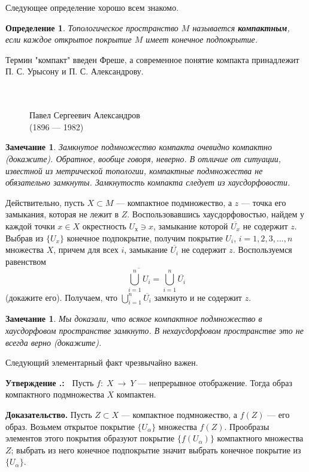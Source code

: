 \documentclass[12pt]{book}
\newcommand{\arrow}{{\:\longrightarrow\:}}
\def\endproof{\hbox{\vrule width 5pt height 5pt depth 0pt}}
\theoremstyle{upshape}
\newtheorem{zadacha}{Задача}[chapter]
\theoremstyle{generic}
\newtheorem{opredelenie}[teorema]{Определение}
\newtheorem{remark}[teorema]{Замечание}
\def\замечание{\begin{remark}}
\def\еза{\end{remark}}
\theoremstyle{upshapenonumber}
\newtheorem{ukazanie}{Указание}[section]
\newcommand{\следствие}{%
     \refstepcounter{teorema}
     {\noindent\bf Следствие \thechapter.\arabic{teorema}:\ }}
\newcommand{\пример}{%
     \refstepcounter{teorema}
     {\noindent\bf Пример \thechapter.\arabic{teorema}:\ }}
\newcommand{\лемма}{%
     \refstepcounter{teorema}
     {\noindent\bf Лемма \thechapter.\arabic{teorema}:\ }}
\newcommand{\теорема}{%
     \refstepcounter{teorema}
     {\noindent\bf Теорема \thechapter.\arabic{teorema}:\ }}
\newcommand{\утверждение}{%
     \refstepcounter{teorema}
     {\noindent\bf Утверждение \thechapter.\arabic{teorema}:\ }}
\def\хфилл{\hfill}
\def\ноиндент{\noindent}
\def\бф{\bf}
\def\ем{\em}
\def\задача{\begin{zadacha}}
\def\ез{\end{zadacha}}
\def\указание{\begin{ukazanie}}
\def\еу{\end{ukazanie}}
\def\определение{\begin{opredelenie}}
\def\ео{\end{opredelenie}}
\def\енум{\begin{enumerate}}
\def\ее{\end{enumerate}}
\begin{document}
Следующее определение хорошо всем знакомо.

\определение
Топологическое пространство $M$ называется
{\бф компактным}, если каждое открытое покрытие $M$
имеет конечное подпокрытие.
\ео

Термин "компакт" введен Фреше, а современное понятие
компакта принадлежит П. С. Урысону и П. С. Александрову.

\begin{figure}[ht]
\begin{center}\ \\
\\
{Павел Сергеевич Александров\\
(1896 --- 1982)}
\end{center}
\end{figure}

\замечание
Замкнутое подмножество компакта очевидно компак\-тно
(докажите). Обратное, вообще говоря, неверно.
В отличие от ситуации, известной из метрической
топологии, компактные подмножества не обязательно
замкнуты. Замкнутость компакта следует из хаусдорфовости.
\еза

Действительно, пусть $X \subset M$ --- компактное
подмножество, а $z$ --- точка его замыкания, которая
не лежит в $Z$. Воспользовавшись хаусдорфовостью, 
найдем у каждой точки $x\in X$ 
окрестность $U_х \ni x$, замыкание которой
$\overline{U_x}$ не содержит $z$. Выбрав из $\{U_x\}$
конечное подпокрытие, получим покрытие $U_i$, $i =1,2,3, ..., n$
множества $X$, причем для всех $i$,
замыкание $\overline{U_i}$ не содержит $z$.
Воспользуемся равенством
\[\overline{\bigcup_{i=1}^n U_i} = \bigcup_{i=1}^n \overline {U_i}
\]
(докажите его). Получаем, что $\bigcup_{i=1}^n \overline {U_i}$
замкнуто и не содержит $z$. 

\замечание
Мы доказали,
что всякое компактное подмножество в хаусдорфовом пространстве
замкнуто. В нехаусдорфовом пространстве это не всегда
верно (докажите).
\еза

Следующий элементарный факт чрезвычайно важен.

\хфилл

\утверждение
Пусть $f:\; X \arrow Y$ --- непрерывное отображение.
Тогда образ компактного подмножества $X$ компактен. 

\хфилл

\ноиндент
{\бф Доказательство.}
Пусть $Z\subset X$ --- компактное подмножество,
а $f(Z)$ --- его образ. Возьмем открытое покрытие $\{U_\alpha\}$
множества $f(Z)$. Прообразы элементов этого  покрытия
образуют покрытие $\{f(U_\alpha)\}$
компактного множества $Z$; выбрать из него конечное
подпокрытие значит выбрать конечное покрытие из
$\{U_\alpha\}$.\endproof
\end{document}
